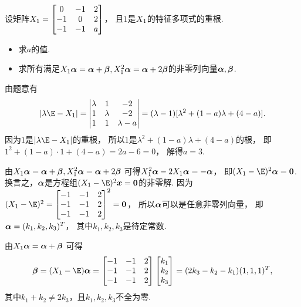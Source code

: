 \begin{example}
设矩阵\(X_1 = \begin{bmatrix}
	0 & -1 & 2 \\
	-1 & 0 & 2 \\
	-1 & -1 & a
\end{bmatrix}\)，
且\(1\)是\(X_1\)的特征多项式的重根.
\begin{itemize}
	\item 求\(a\)的值.
	\item 求所有满足\(X_1 \boldsymbol\alpha = \boldsymbol\alpha + \boldsymbol\beta,
	X_1^2 \boldsymbol\alpha = \boldsymbol\alpha + 2\boldsymbol\beta\)的非零列向量\(\boldsymbol\alpha,\boldsymbol\beta\).
\end{itemize}
\begin{solution}
由题意有\begin{equation*}
	\abs{\lambda\E-\A}
	= \begin{vmatrix}
		\lambda & 1 & -2 \\
		1 & \lambda & -2 \\
		1 & 1 & \lambda-a
	\end{vmatrix}
	= (\lambda-1)[\lambda^2+(1-a)\lambda+(4-a)].
\end{equation*}
因为\(1\)是\(\abs{\lambda\E-\A}\)的重根，
所以\(1\)是\(\lambda^2+(1-a)\lambda+(4-a)\)的根，
即\(1^2+(1-a)\cdot1+(4-a)
= 2a-6
= 0\)，
解得\(a=3\).

由\(X_1 \boldsymbol\alpha = \boldsymbol\alpha + \boldsymbol\beta,
X_1^2 \boldsymbol\alpha = \boldsymbol\alpha + 2\boldsymbol\beta\)
可得\(X_1^2 \boldsymbol\alpha - 2 X_1 \boldsymbol\alpha = -\boldsymbol\alpha\)，
即\((\A-\E)^2 \vb\alpha = \vb0\).
换言之，\(\boldsymbol\alpha\)是方程组\((\A-\E)^2 \vb{x} = \vb0\)的非零解.
因为\((\A-\E)^2 = \begin{bmatrix}
	-1 & -1 & 2 \\
	-1 & -1 & 2 \\
	-1 & -1 & 2
\end{bmatrix}^2
= \vb0\)，
所以\(\boldsymbol\alpha\)可以是任意非零列向量，
即\(\boldsymbol\alpha = (k_1,k_2,k_3)^T\)，
其中\(k_1,k_2,k_3\)是待定常数.

由\(X_1 \boldsymbol\alpha = \boldsymbol\alpha + \boldsymbol\beta\)
可得\begin{equation*}
	\vb\beta = (\A-\E) \vb\alpha
	= \begin{bmatrix}
		-1 & -1 & 2 \\
		-1 & -1 & 2 \\
		-1 & -1 & 2
	\end{bmatrix}
	\begin{bmatrix}
		k_1 \\ k_2 \\ k_3
	\end{bmatrix}
	= (2k_3 - k_2 - k_1)
	(1,1,1)^T,
\end{equation*}
其中\(k_1 + k_2 \neq 2 k_3\)，且\(k_1,k_2,k_3\)不全为零.
\end{solution}
\end{example}

